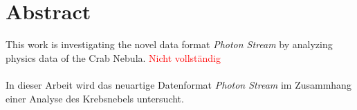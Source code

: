 \chapter{Abstract}

This work is investigating the novel data format \textit{Photon Stream} by
analyzing physics data of the Crab Nebula. \textcolor{red}{Nicht vollständig}
\\
\\
In dieser Arbeit wird das neuartige Datenformat \textit{Photon Stream} im
Zusammhang einer Analyse des Krebsnebels untersucht.
